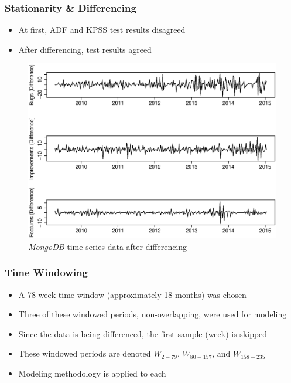\documentclass[presentation]{beamer}
\begin{document}
\begin{frame}[t]
\frametitle{Stationarity \& Differencing}
\footnotesize{
\begin{itemize}
\item{At first, ADF and KPSS test results disagreed}
\item{After differencing, test results agreed}
\end{itemize}
}
\vspace{-.5cm}
\begin{figure}[htbp]
\begin{center}
\includegraphics[height=.6\textheight]{assets/time_series_diff.eps}
\caption{\textit{MongoDB} time series data after differencing}
\end{center}
\end{figure}
\end{frame}

\begin{frame}[t]
\frametitle{Time Windowing}
\begin{itemize}
\item{A 78-week time window (approximately 18 months) was chosen}
\item{Three of these windowed periods, non-overlapping, were used for modeling}
\item{Since the data is being differenced, the first sample (week) is skipped}
\item{These windowed periods are denoted $W_{2-79}$, $W_{80-157}$, and $W_{158-235}$}
\item{Modeling methodology is applied to each}
\end{itemize}
\end{frame}
\end{document}
